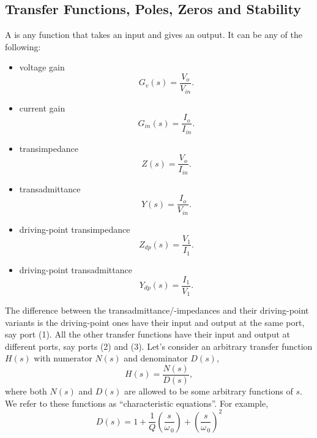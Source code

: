 \subsection{Transfer Functions, Poles, Zeros and Stability}
A  is any function that takes an input and gives an output. It can be any of the following:
\begin{itemize}
\item voltage gain
 \begin{equation}
\label{eq:1.14}
G_{v}(s) = \frac{V_{o}}{V_{in}}.
\end{equation}
\item current gain
  \begin{equation}
\label{eq:1.15}
G_{in}(s) = \frac{I_{o}}{I_{in}}.
\end{equation}
\item transimpedance
    \begin{equation}
  \label{eq:1.16}
Z(s) = \frac{V_{o}}{I_{in}}.
\end{equation}
\item transadmittance
  \begin{equation}
  \label{eq:1.17}
Y(s) = \frac{I_{o}}{V_{in}}.
\end{equation}
\item driving-point transimpedance
  \begin{equation}
  \label{eq:1.18}
Z_{dp}(s) = \frac{V_{1}}{I_{1}}.
\end{equation}  
 \item driving-point transadmittance
  \begin{equation}
  \label{eq:1.19}
Y_{dp}(s) = \frac{I_{1}}{V_{1}}.
\end{equation}  
\end{itemize}
The difference between the transadmittance/-impedances and their driving-point variants is the driving-point ones have their input and output at the same port, say port (1). All the other transfer functions have their input and output at different ports, say ports (2) and (3).
Let's consider an arbitrary transfer function $H(s)$ with numerator $N(s)$ and denominator $D(s)$,
\begin{equation}
\label{eq:1.20}
H(s) = \frac{N(s)}{D(s)},
\end{equation}
where both $N(s)$ and $D(s)$ are allowed to be some arbitrary functions of $s$. We refer to these functions as ``characteristic equations''. For example,
\begin{equation}
\label{eq:1.21}
D(s) = 1 + \frac{1}{Q} \left( \frac{s}{\omega_{\,0}} \right) + \left( \frac{s}{\omega_{\,0}} \right)^{2}
\end{equation}
